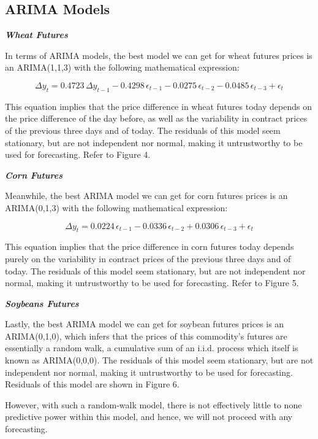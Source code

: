 \documentclass[11pt]{article}
\begin{document}
\subsection{ARIMA Models}

\textbf{\emph{Wheat Futures}}

In terms of ARIMA models, the best model we can get for wheat futures prices is an ARIMA(1,1,3) with the following mathematical expression:

\begin{equation}
\Delta y_{t} = 0.4723\,\Delta y_{t-1} - 0.4298\,\epsilon_{t-1} - 0.0275\,\epsilon_{t-2} - 0.0485\,\epsilon_{t-3} + \epsilon_{t}
\end{equation}

This equation implies that the price difference in wheat futures today depends on the price difference of the day before, as well as the variability in contract prices of the previous three days and of today. The residuals of this model seem stationary, but are not independent nor normal, making it untrustworthy to be used for forecasting. Refer to Figure 4.

\textbf{\emph{Corn Futures}}

Meanwhile, the best ARIMA model we can get for corn futures prices is an ARIMA(0,1,3) with the following mathematical expression:

\begin{equation}
\Delta y_{t} = 0.0224\,\epsilon_{t-1} - 0.0336\,\epsilon_{t-2} + 0.0306\,\epsilon_{t-3} + \epsilon_{t}
\end{equation}

This equation implies that the price difference in corn futures today depends purely on the variability in contract prices of the previous three days and of today. The residuals of this model seem stationary, but are not independent nor normal, making it untrustworthy to be used for forecasting. Refer to Figure 5.

\textbf{\emph{Soybeans Futures}}

Lastly, the best ARIMA model we can get for soybean futures prices is an ARIMA(0,1,0), which infers that the prices of this commodity's futures are essentially a random walk, a cumulative sum of an i.i.d. process which itself is known as ARIMA(0,0,0). The residuals of this model seem stationary, but are not independent nor normal, making it untrustworthy to be used for forecasting. Residuals of this model are shown in Figure 6.

However, with such a random-walk model, there is not effectively little to none predictive power within this model, and hence, we will not proceed with any forecasting.
\end{document}
